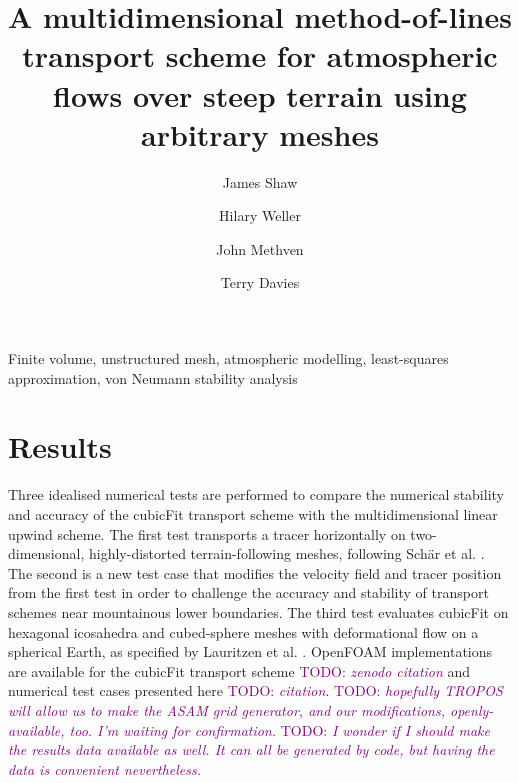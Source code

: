 \documentclass[times]{elsarticle}
\newcommand{\TODO}[1]{\textcolor{purple}{TODO: \emph{#1}}}
\begin{document}
\begin{frontmatter}
\title{A multidimensional method-of-lines transport scheme for atmospheric flows over steep terrain using arbitrary meshes}
\author[uor]{James Shaw}
\author[uor]{Hilary Weller}
\author[uor]{John Methven}
\author[mo]{Terry Davies}

\address[uor]{Department of Meteorology, University of Reading, Reading, United Kingdom}
\address[mo]{Met Office, Exeter, United Kingdom}



\begin{keyword}
	Finite volume, unstructured mesh, atmospheric modelling, least-squares approximation, von Neumann stability analysis
\end{keyword}
\end{frontmatter}





\section{Results}
\label{sec:results}

Three idealised numerical tests are performed to compare the numerical stability and accuracy of the cubicFit transport scheme with the multidimensional linear upwind scheme.  The first test transports a tracer horizontally on two-dimensional, highly-distorted terrain-following meshes, following Sch\"{a}r et al. \citep{schaer2002}.
The second is a new test case that modifies the velocity field and tracer position from the first test in order to challenge the accuracy and stability of transport schemes near mountainous lower boundaries.
The third test evaluates cubicFit on hexagonal icosahedra and cubed-sphere meshes with deformational flow on a spherical Earth, as specified by Lauritzen et al. \citep{lauritzen2012}.
OpenFOAM implementations are available for the cubicFit transport scheme \TODO{zenodo citation} and numerical test cases presented here \TODO{citation}.  \TODO{hopefully TROPOS will allow us to make the ASAM grid generator, and our modifications, openly-available, too.  I'm waiting for confirmation.}  \TODO{I wonder if I should make the results data available as well.  It can all be generated by code, but having the data is convenient nevertheless.}




\end{document}
